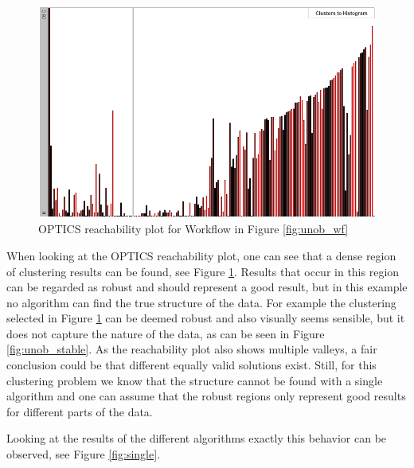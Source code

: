 \documentclass[
	a4paper,
	english,
	twoside,
	openright,               
	11pt                            
	]{report}
\begin{document}
\begin{figure}[h]
	\centering
	\includegraphics[scale=.4]{unob_optics_stable}
	\caption{OPTICS reachability plot for Workflow in Figure \ref{fig:unob_wf}}
	\label{fig:unob_optics_stable}
\end{figure}

When looking at the OPTICS reachability plot, one can see that a dense region of clustering results can be found, see Figure \ref{fig:unob_optics_stable}. Results that occur in this region can be regarded as robust and should represent a good result, but in this example no algorithm can find the true structure of the data. For example the clustering selected in Figure \ref{fig:unob_optics_stable} can be deemed robust and also visually seems sensible, but it does not capture the nature of the data, as can be seen in Figure \ref{fig:unob_stable}. As the reachability plot also shows multiple valleys, a fair conclusion could be that different equally valid solutions exist. Still, for this clustering problem we know that the structure cannot be found with a single algorithm and one can assume that the robust regions only represent good results for different parts of the data. 

Looking at the results of the different algorithms exactly this behavior can be observed, see Figure \ref{fig:single}.
\end{document}
